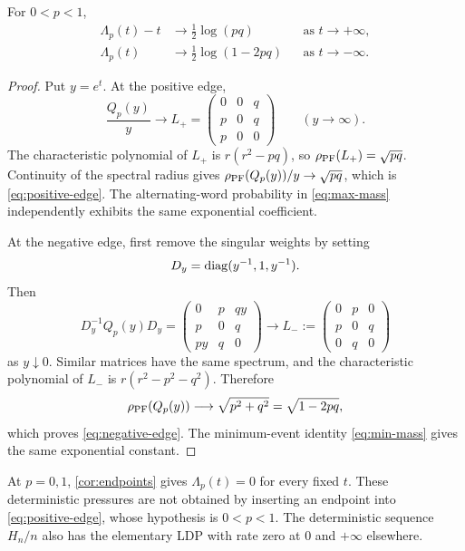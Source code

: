 \begin{theorem}
\label{thm:temperature}
For $0<p<1$,
\begin{align}
 \Lambda_p(t)-t&\longrightarrow\frac12\log(pq)
 &&\text{as }t\to+\infty,\label{eq:positive-edge}\\
 \Lambda_p(t)&\longrightarrow\frac12\log(1-2pq)
 &&\text{as }t\to-\infty.\label{eq:negative-edge}
\end{align}
\end{theorem}

\begin{proof}
Put $y=e^t$.  At the positive edge,
\[
 \frac{Q_p(y)}{y}\longrightarrow
 L_+=\begin{pmatrix}0&0&q\\p&0&q\\p&0&0\end{pmatrix}
 \qquad(y\to\infty).
\]
The characteristic polynomial of $L_+$ is $r(r^2-pq)$, so
$\rho_{\mathrm{PF}}(L_+)=\sqrt{pq}$.  Continuity of the spectral radius gives
$\rho_{\mathrm{PF}}(Q_p(y))/y\to\sqrt{pq}$, which is \eqref{eq:positive-edge}.
The alternating-word probability in \eqref{eq:max-mass} independently
exhibits the same exponential coefficient.

At the negative edge, first remove the singular weights by setting
\[
 D_y=\operatorname{diag}(y^{-1},1,y^{-1}).
\]
Then
\begin{equation}
 \label{eq:negative-similarity}
 D_y^{-1}Q_p(y)D_y
 =\begin{pmatrix}0&p&qy\\p&0&q\\py&q&0\end{pmatrix}
 \longrightarrow
 L_-:=\begin{pmatrix}0&p&0\\p&0&q\\0&q&0\end{pmatrix}
\end{equation}
as $y\downarrow0$.  Similar matrices have the same spectrum, and the
characteristic polynomial of $L_-$ is
$r(r^2-p^2-q^2)$.  Therefore
\[
 \rho_{\mathrm{PF}}(Q_p(y))\longrightarrow\sqrt{p^2+q^2}
 =\sqrt{1-2pq},
\]
which proves \eqref{eq:negative-edge}.  The minimum-event identity
\eqref{eq:min-mass} gives the same exponential constant.
\end{proof}

At $p=0,1$, \cref{cor:endpoints} gives $\Lambda_p(t)=0$ for every fixed
$t$.  These deterministic pressures are not obtained by inserting an
endpoint into \eqref{eq:positive-edge}, whose hypothesis is $0<p<1$.
The deterministic sequence $H_n/n$ also has the elementary LDP with rate
zero at $0$ and $+\infty$ elsewhere.
